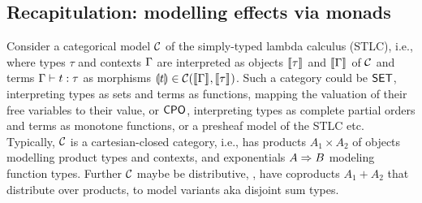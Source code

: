 \documentclass[acmsmall,review,anonymous]{acmart}\settopmatter{printfolios=true,printccs=false,printacmref=false}
\newcommand{\graybox}[1]{\grayboxtext{$#1$}}
\begin{document}
\newcommand{\ValTy}[3]{#1 \vdash #2 : #3}
\newcommand{\oCompTy}{\ValTy}
\newcommand{\CompTy}[4]{#1 \vdash #2 : #4 \mid #3}
\newcommand{\gpValTy}[4]{\graybox{(#1)}#2 \vdash #3 : #4}
\newcommand{\gqValTy}[4]{\graybox{#1}#2 \vdash #3 : #4}
\newcommand{\gpCompTy}[4]{\graybox{(#1)}#2 \vdash #3 : #4}
\newcommand{\gqCompTy}[4]{\graybox{#1}#2 \vdash #3 : #4}
\newcommand{\pValTy}[4]{(#1)#2 \vdash #3 : #4}
\newcommand{\qValTy}[4]{#1#2 \vdash #3 : #4}
\newcommand{\pCompTy}[4]{(#1)#2 \vdash #3 : #4}
\newcommand{\qCompTy}[4]{#1#2 \vdash #3 : #4}
\newcommand{\ru}{\dfrac}
\newcommand{\nru}[3]{#1\;\dfrac{#2}{#3}}
\newcommand{\nrux}[4]{#1\;\dfrac{#2}{#3}\;#4}

\newcommand{\rulename}[1]{\ensuremath{\mbox{\textsc{#1}}}\xspace}
\newcommand{\rintro}[1]{\ensuremath{\mathord{#1}\mbox{-\rulename{intro}}}\xspace}
\newcommand{\relim}[1]{\ensuremath{\mathord{#1}\mbox{-\rulename{elim}}}\xspace}
\newcommand{\rvar}{\rulename{var}}
\newcommand{\rlet}{\rulename{let}}
\newcommand{\rsub}{\rulename{sub}}
\newcommand{\rweak}{\rulename{weak}}


\subsection{Recapitulation: modelling effects via monads}
\label{sec:ccc}

Consider a categorical model $\mathcal{C}$ of the simply-typed lambda calculus
(STLC), i.e., where types $\tau$ and contexts $\Gamma$ are interpreted as
objects $\llbracket\tau\rrbracket^{}$ and $\llbracket\Gamma\rrbracket^{}$ of $\mathcal{C}$ and terms
$\Gamma \vdash t : \tau$ as morphisms $\llparenthesis t\rrparenthesis \in \mathcal{C}(\llbracket\Gamma\rrbracket^{},\llbracket\tau\rrbracket^{})$.
Such a category could be $\mathsf{SET}$, interpreting types as sets and terms
as functions, mapping the valuation of their free variables to their
value, or $\mathsf{CPO}$, interpreting types as complete partial orders and
terms as monotone functions, or a presheaf model of the STLC etc.
Typically, $\mathcal{C}$ is a cartesian-closed category, i.e., has products
$A_1 \times A_2$ of objects modelling product types and contexts,
and exponentials $A \Rightarrow
B$ modeling function types.  Further $\mathcal{C}$ maybe be distributive,
\ie, have coproducts $A_1 + A_2$ that distribute over products, to
model variants aka disjoint sum types.
\end{document}
